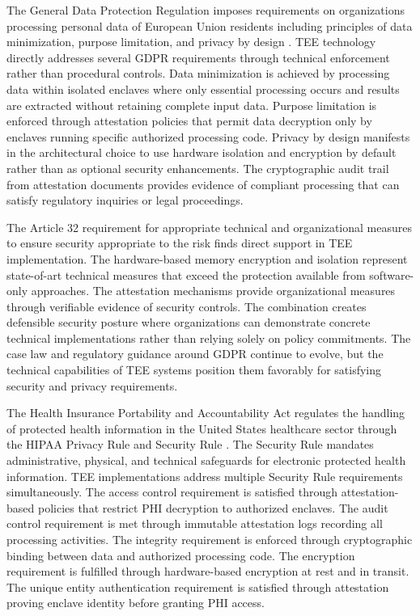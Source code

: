 The General Data Protection Regulation imposes requirements on organizations processing personal data of European Union residents including principles of data minimization, purpose limitation, and privacy by design \cite{gdpr_compliance}. TEE technology directly addresses several GDPR requirements through technical enforcement rather than procedural controls. Data minimization is achieved by processing data within isolated enclaves where only essential processing occurs and results are extracted without retaining complete input data. Purpose limitation is enforced through attestation policies that permit data decryption only by enclaves running specific authorized processing code. Privacy by design manifests in the architectural choice to use hardware isolation and encryption by default rather than as optional security enhancements. The cryptographic audit trail from attestation documents provides evidence of compliant processing that can satisfy regulatory inquiries or legal proceedings.

The Article 32 requirement for appropriate technical and organizational measures to ensure security appropriate to the risk finds direct support in TEE implementation. The hardware-based memory encryption and isolation represent state-of-art technical measures that exceed the protection available from software-only approaches. The attestation mechanisms provide organizational measures through verifiable evidence of security controls. The combination creates defensible security posture where organizations can demonstrate concrete technical implementations rather than relying solely on policy commitments. The case law and regulatory guidance around GDPR continue to evolve, but the technical capabilities of TEE systems position them favorably for satisfying security and privacy requirements.

The Health Insurance Portability and Accountability Act regulates the handling of protected health information in the United States healthcare sector through the HIPAA Privacy Rule and Security Rule \cite{hipaa_security}. The Security Rule mandates administrative, physical, and technical safeguards for electronic protected health information. TEE implementations address multiple Security Rule requirements simultaneously. The access control requirement is satisfied through attestation-based policies that restrict PHI decryption to authorized enclaves. The audit control requirement is met through immutable attestation logs recording all processing activities. The integrity requirement is enforced through cryptographic binding between data and authorized processing code. The encryption requirement is fulfilled through hardware-based encryption at rest and in transit. The unique entity authentication requirement is satisfied through attestation proving enclave identity before granting PHI access.

